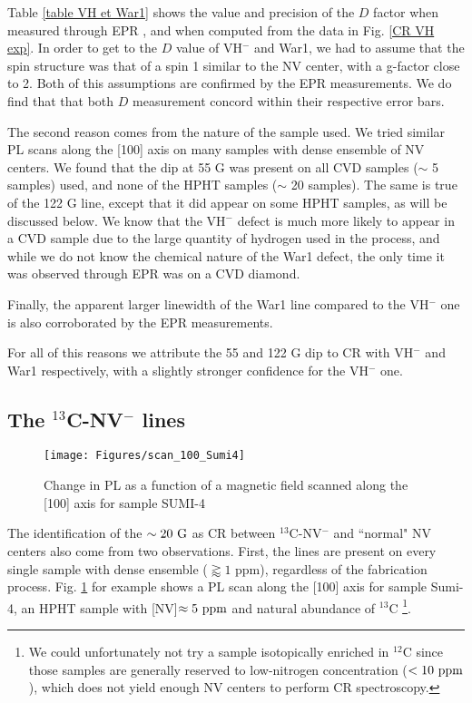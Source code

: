 \documentclass[a4paper,11pt]{report}
\begin{document}
Table \ref{table VH et War1} shows the value and precision of the $D$ factor when measured through EPR \citep{cruddace2007magnetic}, and when computed from the data in Fig. \ref{CR VH exp}. In order to get to the $D$ value of VH$^-$ and War1, we had to assume that the spin structure was that of a spin 1 similar to the NV center, with a g-factor close to 2. Both of this assumptions are confirmed by the EPR measurements. We do find that that both $D$ measurement concord within their respective error bars.

The second reason comes from the nature of the sample used. We tried similar PL scans along the [100] axis on many samples with dense ensemble of NV centers. We found that the dip at 55 G was present on all CVD samples ($\sim$ 5 samples) used, and none of the HPHT samples ($\sim$ 20 samples). The same is true of the 122 G line, except that it did appear on some HPHT samples, as will be discussed below. We know that the VH$^-$ defect is much more likely to appear in a CVD sample due to the large quantity of hydrogen used in the process, and while we do not know the chemical nature of the War1 defect, the only time it was observed through EPR was on a CVD diamond.

Finally, the apparent larger linewidth of the War1 line compared to the VH$^-$ one is also corroborated by the EPR measurements.

For all of this reasons we attribute the 55 and 122 G dip to CR with VH$^-$ and War1 respectively, with a slightly stronger confidence for the VH$^-$ one.

\subsection{The $^{13}$C-NV$^-$ lines}

\begin{figure}[h]
\centering
\texttt{[image: Figures/scan\_100\_Sumi4]}
\caption{Change in PL as a function of a magnetic field scanned along the [100] axis for sample SUMI-4}
\label{scan sumi 4}
\end{figure}

The identification of the $\sim 20\ \rm G$ as CR between $^{13}$C-NV$^-$ and ``normal" NV centers also come from two observations. First, the lines are present on every single sample with dense ensemble ($\gtrapprox 1$ ppm), regardless of the fabrication process. Fig. \ref{scan sumi 4} for example shows a PL scan along the [100] axis for sample Sumi-4, an HPHT sample with [NV]$\approx 5\ \rm ppm$ and natural abundance of $^{13}$C \footnote{We could unfortunately not try a sample isotopically enriched in $^{12}$C since those samples are generally reserved to low-nitrogen concentration ($< 10\ \rm ppm$), which does not yield enough NV centers to perform CR spectroscopy. }. 
\end{document}

